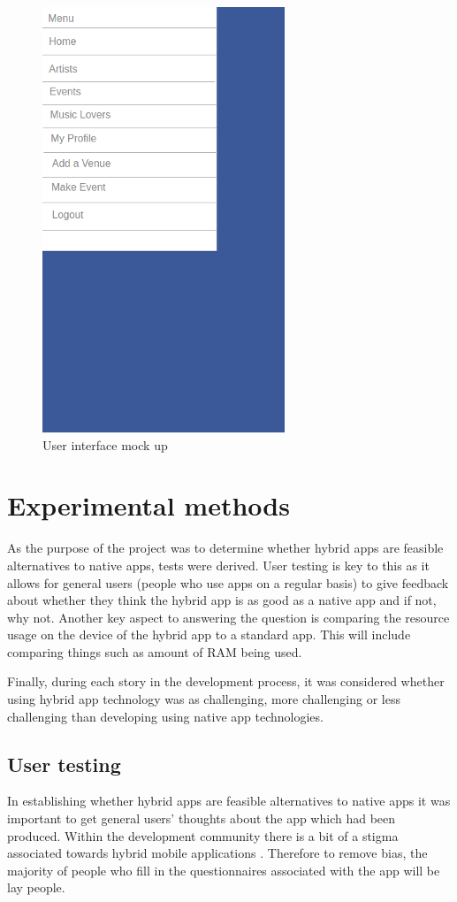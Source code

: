 \begin{center}
\begin{figure}[H]
\includegraphics[scale=0.5]{images/ui3}
\caption{User interface mock up}
\end{figure}
\end{center}

\section{Experimental methods}
As the purpose of the project was to determine whether hybrid apps are feasible alternatives to native apps, tests were derived. User testing is key to this as it allows for general users (people who use apps on a regular basis) to give feedback about whether they think the hybrid app is as good as a native app and if not, why not. Another key aspect to answering the question is comparing the resource usage on the device of the hybrid app to a standard app. This will include comparing things such as amount of RAM being used.

Finally, during each story in the development process, it was considered whether using hybrid app technology was as challenging, more challenging or less challenging than developing using native app technologies.

\subsection{User testing}
In establishing whether hybrid apps are feasible alternatives to native apps it was important to get general users' thoughts about the app which had been produced. Within the development community there is a bit of a stigma associated towards hybrid mobile applications \cite{hybridcrap}. Therefore to remove bias, the majority of people who fill in the questionnaires associated with the app will be lay people.

